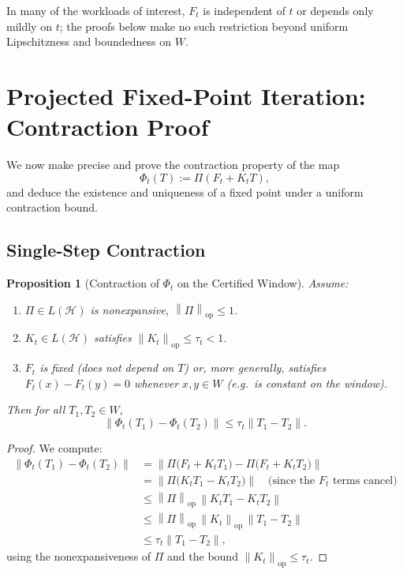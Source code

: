 \documentclass[11pt]{article}
\theoremstyle{definition}
\theoremstyle{plain}
\newtheorem{proposition}[definition]{Proposition}
\theoremstyle{remark}
\newcommand{\Hcal}{\mathcal{H}}
\newcommand{\norm}[1]{\left\lVert #1 \right\rVert}
\begin{document}
In many of the workloads of interest, \(F_t\) is independent of \(t\) or depends only mildly on \(t\); the proofs below make no such restriction beyond uniform Lipschitzness and boundedness on \(W\).

\section{Projected Fixed-Point Iteration: Contraction Proof}

We now make precise and prove the contraction property of the map
\[
  \Phi_t(T) := \Pi(F_t + K_t T),
\]
and deduce the existence and uniqueness of a fixed point under a uniform contraction bound.

\subsection{Single-Step Contraction}

\begin{proposition}[Contraction of \(\Phi_t\) on the Certified Window]
Assume:
\begin{enumerate}
  \item \(\Pi \in L(\Hcal)\) is nonexpansive, \(\norm{\Pi}_{\mathrm{op}} \le 1\).
  \item \(K_t \in L(\Hcal)\) satisfies \(\norm{K_t}_{\mathrm{op}} \le \tau_t < 1\).
  \item \(F_t\) is fixed (does not depend on \(T\)) or, more generally, satisfies \(F_t(x)-F_t(y)=0\) whenever \(x,y\in W\) (e.g.\ is constant on the window).
\end{enumerate}
Then for all \(T_1,T_2 \in W\),
\[
  \norm{\Phi_t(T_1) - \Phi_t(T_2)}
  \le \tau_t \norm{T_1 - T_2}.
\]
\end{proposition}

\begin{proof}
We compute:
\begin{align*}
  \norm{\Phi_t(T_1) - \Phi_t(T_2)}
    &= \norm{ \Pi\bigl(F_t + K_t T_1\bigr) - \Pi\bigl(F_t + K_t T_2\bigr)}\\
    &= \norm{ \Pi\bigl(K_t T_1 - K_t T_2\bigr)} \quad\text{(since the \(F_t\) terms cancel)}\\
    &\le \norm{\Pi}_{\mathrm{op}}\, \norm{K_t T_1 - K_t T_2}\\
    &\le \norm{\Pi}_{\mathrm{op}}\, \norm{K_t}_{\mathrm{op}}\, \norm{T_1 - T_2}\\
    &\le \tau_t \norm{T_1 - T_2},
\end{align*}
using the nonexpansiveness of \(\Pi\) and the bound \(\norm{K_t}_{\mathrm{op}} \le \tau_t\).
\end{proof}
\end{document}
